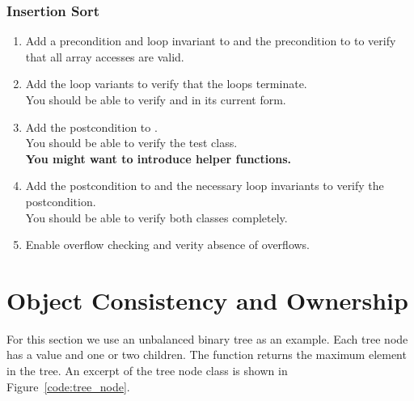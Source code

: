 \subsubsection*{Insertion Sort}

\begin{enumerate}[label=\bfseries Task \arabic*:, leftmargin=1.8cm]
\item Add a precondition and loop invariant to  and the precondition to  to verify that all array accesses are valid.
\item Add the loop variants to verify that the loops terminate. \\
      You should be able to verify  and  in its current form.
\item Add the postcondition to . \\
      You should be able to verify the test class. \\
      \textbf{You might want to introduce helper functions.}
\item Add the postcondition to  and the necessary loop invariants to verify the postcondition. \\
      You should be able to verify both classes completely.
\item Enable overflow checking and verity absence of overflows.
\end{enumerate}


\section{Object Consistency and Ownership} \label{sec:ownership}

For this section we use an unbalanced binary tree as an example. Each tree node has a value and one or two children. The  function returns the maximum element in the tree. An excerpt of the tree node class is shown in Figure~\ref{code:tree_node}.

